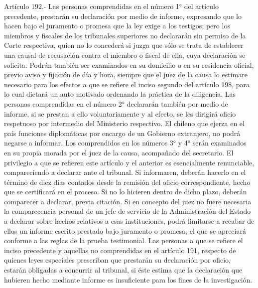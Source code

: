     Artículo 192.- Las personas comprendidas en el número 1° del artículo precedente, prestarán su declaración por medio de informe, expresando que lo hacen bajo el juramento o promesa que la ley exige a los testigos; pero los miembros y fiscales de los tribunales superiores no declararán sin permiso de la Corte respectiva, quien no lo concederá si juzga que sólo se trata de establecer una causal de recusación contra el miembro o fiscal de ella, cuya declaración se solicita.
    Podrán también ser examinados en su domicilio o en su residencia oficial, previo aviso y fijación de día y hora, siempre que el juez de la causa lo estimare necesario para los efectos a que se refiere el inciso segundo del artículo 198, para lo cual dictará un auto motivado ordenando la práctica de la diligencia.
    Las personas comprendidas en el número 2° declararán también por medio de informe, si se prestan a ello voluntariamente y al efecto, se les dirigirá oficio respetuoso por intermedio del Ministerio respectivo. El chileno que ejerza en el país funciones diplomáticas por encargo de un Gobierno extranjero, no podrá negarse a informar.
    Los comprendidos en los números 3° y 4° serán examinados en su propia morada por el juez de la causa, acompañado del secretario.
    El privilegio a que se refieren este artículo y el anterior es esencialmente renunciable, compareciendo a declarar ante el tribunal.  Si informaren, deberán hacerlo en el término de diez días contados desde la remisión del oficio correspondiente, hecho que se certificará en el proceso. Si no lo hicieren dentro de dicho plazo, deberán comparecer a declarar, previa citación.
    Si en concepto del juez no fuere necesaria la comparecencia personal de un jefe de servicio de la Administración del Estado a declarar sobre hechos relativos a esas instituciones, podrá limitarse a recabar de ellos un informe escrito prestado bajo juramento o promesa, el que se apreciará conforme a las reglas de la prueba testimonial.
    Las personas a que se refiere el inciso precedente y aquellas no comprendidas en el artículo 191, respecto de quienes leyes especiales prescriban que prestarán su declaración por oficio, estarán obligadas a concurrir al tribunal, si éste estima que la declaración que hubieren hecho mediante informe es insuficiente para los fines de la investigación.


